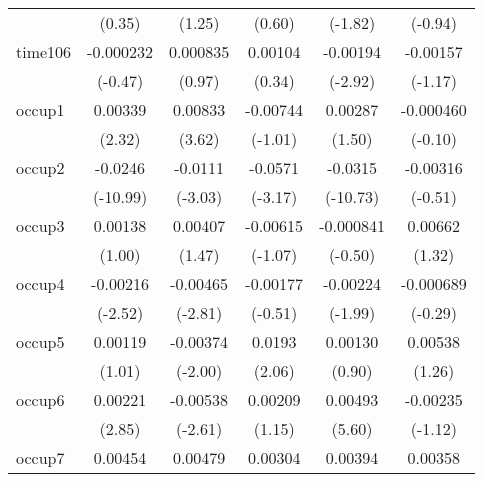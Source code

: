 \begin{table}[htbp]
\begin{tabular}{l*{5}{c}}
            &      (0.35)         &      (1.25)         &      (0.60)         &     (-1.82)         &     (-0.94)         \\
time106     &   -0.000232         &    0.000835         &     0.00104         &    -0.00194\sym{**} &    -0.00157         \\
            &     (-0.47)         &      (0.97)         &      (0.34)         &     (-2.92)         &     (-1.17)         \\
occup1      &     0.00339\sym{*}  &     0.00833\sym{***}&    -0.00744         &     0.00287         &   -0.000460         \\
            &      (2.32)         &      (3.62)         &     (-1.01)         &      (1.50)         &     (-0.10)         \\
occup2      &     -0.0246\sym{***}&     -0.0111\sym{**} &     -0.0571\sym{**} &     -0.0315\sym{***}&    -0.00316         \\
            &    (-10.99)         &     (-3.03)         &     (-3.17)         &    (-10.73)         &     (-0.51)         \\
occup3      &     0.00138         &     0.00407         &    -0.00615         &   -0.000841         &     0.00662         \\
            &      (1.00)         &      (1.47)         &     (-1.07)         &     (-0.50)         &      (1.32)         \\
occup4      &    -0.00216\sym{*}  &    -0.00465\sym{**} &    -0.00177         &    -0.00224\sym{*}  &   -0.000689         \\
            &     (-2.52)         &     (-2.81)         &     (-0.51)         &     (-1.99)         &     (-0.29)         \\
occup5      &     0.00119         &    -0.00374\sym{*}  &      0.0193\sym{*}  &     0.00130         &     0.00538         \\
            &      (1.01)         &     (-2.00)         &      (2.06)         &      (0.90)         &      (1.26)         \\
occup6      &     0.00221\sym{**} &    -0.00538\sym{**} &     0.00209         &     0.00493\sym{***}&    -0.00235         \\
            &      (2.85)         &     (-2.61)         &      (1.15)         &      (5.60)         &     (-1.12)         \\
occup7      &     0.00454\sym{***}&     0.00479\sym{*}  &     0.00304         &     0.00394\sym{*}  &     0.00358         \\

\end{tabular}
\end{table}
